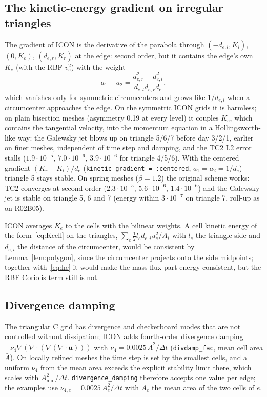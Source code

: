 \documentclass[11pt,a4paper]{article}
\newcommand{\bu}{\mathbf{u}}
\newcommand{\code}[1]{\texttt{#1}}
\begin{document}
\subsection{The kinetic-energy gradient on irregular triangles}

The gradient of ICON is the derivative of the parabola through $(-d_{e,l},K_l)$,
$(0,K_e)$, $(d_{e,r},K_r)$ at the edge: second order, but it contains the edge's
own $K_e$ (with the RBF $v_e^2$) with the weight
\[
  a_1 - a_2 = \frac{d_{e,r}^2 - d_{e,l}^2}{d_{e,l}d_{e,r}d_e},
\]
which vanishes only for symmetric circumcenters and grows like $1/d_{e,l}$ when
a circumcenter approaches the edge. On the symmetric ICON grids it is harmless;
on plain bisection meshes (asymmetry 0.19 at every level) it couples $K_e$, which
contains the tangential velocity, into the momentum equation in a
Hollingsworth-like way: the Galewsky jet blows up on triangle 5/6/7 before day
3/2/1, earlier on finer meshes, independent of time step and damping, and the
TC2 L2 error stalls ($1.9\cdot10^{-5}$, $7.0\cdot10^{-6}$, $3.9\cdot10^{-6}$ for
triangle 4/5/6). With the centered gradient $(K_r-K_l)/d_e$
(\code{kinetic\_gradient = :centered}, $a_1=a_2=1/d_e$) triangle 5 stays stable.
On spring meshes ($\beta = 1.2$) the original scheme works: TC2 converges at
second order ($2.3\cdot10^{-5}$, $5.6\cdot10^{-6}$, $1.4\cdot10^{-6}$) and the
Galewsky jet is stable on triangle 5, 6 and 7 (energy within $3\cdot10^{-7}$
on triangle 7, roll-up as on R02B05).

ICON averages $K_e$ to the cells with the bilinear weights. A cell kinetic energy of
the form~\eqref{eq:Kcell} on the triangles, $\sum_e\tfrac12l_ed_{e,i}u_e^2/A_i$ with $l_e$ the
triangle side and $d_{e,i}$ the distance of the circumcenter, would be consistent by
Lemma~\ref{lem:polygon}, since the circumcenter projects onto the side midpoints;
together with~\eqref{eq:he} it would make the mass flux part energy consistent, but
the RBF Coriolis term still is not.

\subsection{Divergence damping}

The triangular C grid has divergence and checkerboard modes that are not
controlled without dissipation; ICON adds fourth-order divergence damping
$-\nu_4\nabla(\nabla\cdot(\nabla(\nabla\cdot\bu)))$ with
$\nu_4 = 0.0025\,\bar A^2/\Delta t$ (\code{divdamp\_fac}, mean cell area $\bar A$).
On locally refined meshes the time step is set by the smallest cells, and a uniform
$\nu_4$ from the mean area exceeds the explicit stability limit there, which
scales with $A_{\min}^2/\Delta t$. \code{divergence\_damping} therefore
accepts one value per edge; the examples use
$\nu_{4,e} = 0.0025\,A_e^2/\Delta t$ with $A_e$ the mean area of the two cells of $e$.
\end{document}
